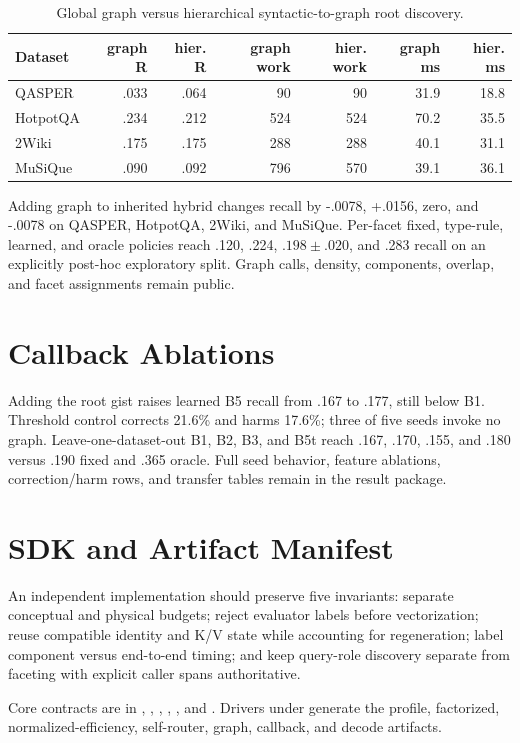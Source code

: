 \documentclass[11pt]{article}
\begin{document}
\begin{table}[H]
\centering
\small
\caption{Global graph versus hierarchical syntactic-to-graph root discovery.}
\begin{tabular}{lrrrrrr}
\toprule
Dataset & graph R & hier. R & graph work & hier. work & graph ms & hier. ms\\
\midrule
QASPER & .033 & .064 & 90 & 90 & 31.9 & 18.8\\
HotpotQA & .234 & .212 & 524 & 524 & 70.2 & 35.5\\
2Wiki & .175 & .175 & 288 & 288 & 40.1 & 31.1\\
MuSiQue & .090 & .092 & 796 & 570 & 39.1 & 36.1\\
\bottomrule
\end{tabular}
\end{table}

Adding graph to inherited hybrid changes recall by -.0078, +.0156, zero, and -.0078 on QASPER,
HotpotQA, 2Wiki, and MuSiQue. Per-facet fixed, type-rule, learned, and oracle policies reach .120,
.224, $.198\pm.020$, and .283 recall on an explicitly post-hoc exploratory split. Graph calls,
density, components, overlap, and facet assignments remain public.

\section{Callback Ablations}

Adding the root gist raises learned B5 recall from .167 to .177, still below B1. Threshold control
corrects 21.6\% and harms 17.6\%; three of five seeds invoke no graph. Leave-one-dataset-out B1, B2,
B3, and B5t reach .167, .170, .155, and .180 versus .190 fixed and .365 oracle. Full seed behavior,
feature ablations, correction/harm rows, and transfer tables remain in the result package.

\section{SDK and Artifact Manifest}
\label{app:artifacts}

An independent implementation should preserve five invariants: separate conceptual and physical
budgets; reject evaluator labels before vectorization; reuse compatible identity and K/V state while
accounting for regeneration; label component versus end-to-end timing; and keep query-role discovery
separate from faceting with explicit caller spans authoritative.

Core contracts are in ,
, ,
, , and
. Drivers under  generate
the profile, factorized, normalized-efficiency, self-router, graph, callback, and decode artifacts.
\end{document}
